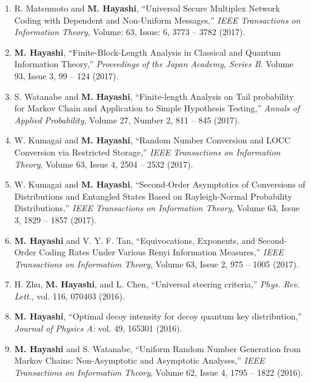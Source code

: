 \documentclass[a4paper,12pt,oneside]{article}
\begin{document}
\begin{enumerate}
\item
R. Matsumoto and \textbf{M. Hayashi},  
``Universal Secure Multiplex Network Coding with Dependent and Non-Uniform Messages,'' 
{\em IEEE Transactions on Information Theory}, Volume: 63, Issue: 6, 3773 -- 3782 (2017). 

\item 
\textbf{M. Hayashi}, ``Finite-Block-Length Analysis in Classical and Quantum Information Theory,'' 
{\em Proceedings of the Japan Academy, Series B}.
Volume 93, Issue 3, 99 -- 124 (2017).

\item 
S. Watanabe and \textbf{M. Hayashi}, ``Finite-length Analysis on Tail probability for Markov Chain and Application to Simple Hypothesis Testing,'' 
{\em Annals of Applied Probability},
Volume 27, Number 2, 811 -- 845 (2017).

\item 
W. Kumagai and \textbf{M. Hayashi}, ``Random Number Conversion and LOCC Conversion via Restricted Storage,'' 
{\em IEEE Transactions on Information Theory},
Volume 63, Issue 4, 2504 -- 2532 (2017). 

\item 
W. Kumagai and \textbf{M. Hayashi}, ``Second-Order Asymptotics of Conversions of Distributions and Entangled States Based on Rayleigh-Normal Probability Distributions,'' 
{\em IEEE Transactions on Information Theory}, Volume 63, Issue 3, 1829 -- 1857 (2017). 

\item 
\textbf{M. Hayashi} and V. Y. F. Tan, ``Equivocations, Exponents, and Second-Order Coding Rates Under Various Renyi Information Measures,'' 
{\em IEEE Transactions on Information Theory}, Volume 63, Issue 2, 975 -- 1005 (2017). 

\item 
H. Zhu, \textbf{M. Hayashi}, and L. Chen, ``Universal steering criteria,'' 
{\em Phys. Rev. Lett.}, vol. 116, 070403 (2016). 

\item 
\textbf{M. Hayashi}, 
``Optimal decoy intensity for decoy quantum key distribution,'' 
{\em Journal of Physics A:} vol. 49, 165301 (2016). 

\item 
\textbf{M. Hayashi} and S. Watanabe, ``Uniform Random Number Generation from Markov Chains: Non-Asymptotic and Asymptotic Analyses,'' 
{\em IEEE Transactions on Information Theory}, Volume 62, Issue 4, 1795 -- 1822 (2016). 


\end{enumerate}
\end{document}
